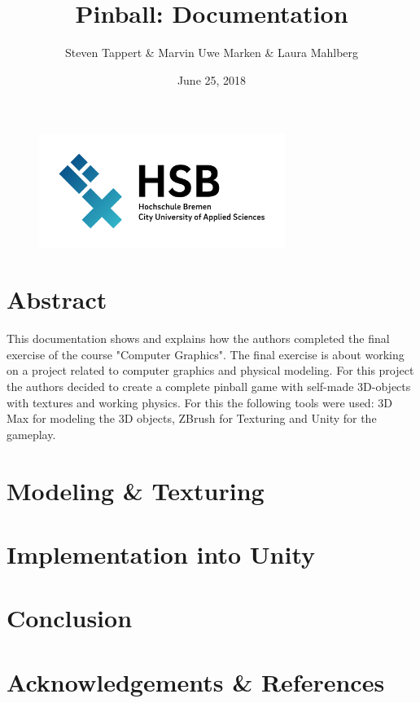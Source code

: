 \documentclass[11.5pt,oneside,a4paper]{scrartcl}
\title{Pinball: Documentation}
\author{Steven Tappert \& Marvin Uwe Marken \& Laura Mahlberg}
\date{June 25, 2018}
\newcounter{ct}
\begin{document}
\clearpage
{\let\newpage\relax\maketitle}
\thispagestyle{empty}
\vspace{20pt}

\begin{figure}
	\centering
	\includegraphics[width=8cm]{hsb.png} \\
\end{figure}

\newpage
\tableofcontents
\newpage

\section{Abstract}
This documentation shows and explains how the authors completed the final exercise of the course "Computer Graphics". The final exercise is about working on a project related to computer graphics and physical modeling.
For this project the authors decided to create a complete pinball game with self-made 3D-objects with textures and working physics. For this the following tools were used: 3D Max for modeling the 3D objects, ZBrush for Texturing and Unity for the gameplay. 

\section{Modeling \& Texturing}

\section{Implementation into Unity}

\section{Conclusion}

\section{Acknowledgements \& References}
\end{document}
